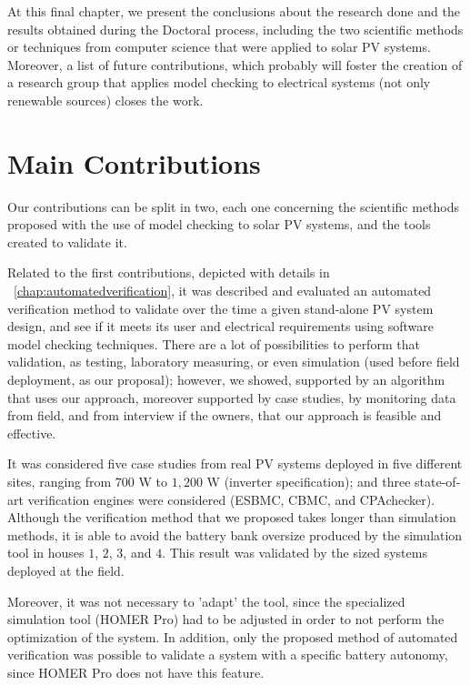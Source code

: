 At this final chapter, we present the conclusions about the research done and the results obtained during the Doctoral process, including the two scientific methods or techniques from computer science that were applied to solar PV systems. Moreover, a list of future contributions, which probably will foster the creation of a research group that applies model checking to electrical systems (not only renewable sources) closes the work.

\section{Main Contributions}

Our contributions can be split in two, each one concerning the scientific methods proposed with the use of model checking to solar PV systems, and the tools created to validate it.

Related to the first contributions, depicted with details in ~\autoref{chap:automatedverification}, it was described and evaluated an automated verification method to validate over the time a given stand-alone PV system design, and see if it meets its user and electrical requirements using software model checking techniques. There are a lot of possibilities to perform that validation, as testing, laboratory measuring, or even simulation (used before field deployment, as our proposal); however, we showed, supported by an algorithm that uses our approach, moreover supported by case studies, by monitoring data from field, and from interview if the owners, that our approach is feasible and effective.

It was considered five case studies from real PV systems deployed in five different sites, ranging from $700$ W to $1,200$ W (inverter specification); and three state-of-art verification engines were considered (ESBMC, CBMC, and CPAchecker). Although the verification method that we proposed takes longer than simulation methods, it is able to avoid the battery bank oversize produced by the simulation tool in houses $1$, $2$, $3$, and $4$. This result was validated by the sized systems deployed at the field.

Moreover, it was not necessary to 'adapt' the tool, since the specialized simulation tool (HOMER Pro) had to be adjusted in order to not perform the optimization of the system. In addition, only the proposed method of automated verification was possible to validate a system with a specific battery autonomy, since HOMER Pro does not have this feature.


